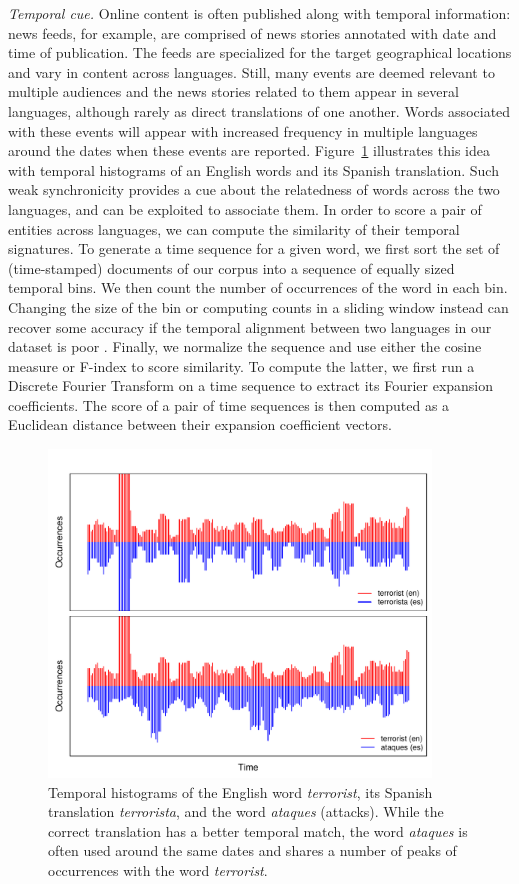 \documentclass{article}
\newcommand{\mtodo}[1]{}
\newcommand{\figref}[1]{Figure~\ref{#1}}
\begin{document}
\noindent\emph{Temporal cue.} Online content is often published along with temporal information: news feeds, for example, are comprised of news stories annotated with date and time of publication.  The feeds are specialized for the target geographical locations and vary in content across languages.  Still, many events are deemed relevant to multiple audiences and the news stories related to them appear in several languages, although rarely as direct translations of one another.  Words associated with these events will appear with increased frequency in multiple languages around the dates when these events are reported.  \figref{fig:temporal} illustrates this idea with temporal histograms of an English words and its Spanish translation. Such weak synchronicity provides a cue about the relatedness of words across the two languages, and can be exploited to associate them.  In order to score a pair of entities across languages, we can compute the similarity of their temporal signatures.\mtodo{\figref{fig:temporal} is from Europarl, add the one from the proposal instead.}  To generate a time sequence for a given word, we first sort the set of (time-stamped) documents of our corpus into a sequence of equally sized temporal bins.  We then count the number of occurrences of the word in each bin.  Changing the size of the bin or computing counts in a sliding window instead can recover some accuracy if the temporal alignment between two languages in our dataset is poor \cite{Klementiev:2006b}.  Finally, we normalize the sequence and use either the cosine measure or F-index \cite{Hetland:2004} to score similarity. To compute the latter, we first run a Discrete Fourier Transform on a time sequence to extract its Fourier expansion coefficients. The score of a pair of time sequences is then computed as a Euclidean distance between their expansion coefficient vectors. \\

\begin{figure}[h]
\centerline{\mbox{\includegraphics[width=4in]{figures/temporal/temporal}}}
\caption{Temporal histograms of the English word {\em terrorist}, its Spanish translation {\em terrorista}, and the word {\em ataques} (attacks). While the correct translation has a better temporal match, the word {\em ataques} is often used around the same dates and shares a number of peaks of occurrences with the word {\em terrorist}.}
\label{fig:temporal}
\end{figure}
\end{document}
